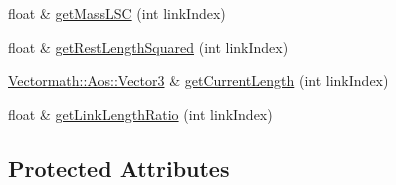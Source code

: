 \begin{DoxyCompactItemize}
\item 
float \& \hyperlink{classbt_soft_body_link_data_a4738763134cedd630e826f2346947935}{get\+Mass\+L\+S\+C} (int link\+Index)
\item 
float \& \hyperlink{classbt_soft_body_link_data_a7ea5bd9cf45bdf9ae4872437e0f867b8}{get\+Rest\+Length\+Squared} (int link\+Index)
\item 
\hyperlink{class_vectormath_1_1_aos_1_1_vector3}{Vectormath\+::\+Aos\+::\+Vector3} \& \hyperlink{classbt_soft_body_link_data_a9655532adc375429002af37fe757ef3b}{get\+Current\+Length} (int link\+Index)
\item 
float \& \hyperlink{classbt_soft_body_link_data_a1d1b051d331898d172d709676dca5ad7}{get\+Link\+Length\+Ratio} (int link\+Index)
\end{DoxyCompactItemize}
\subsection*{Protected Attributes}
